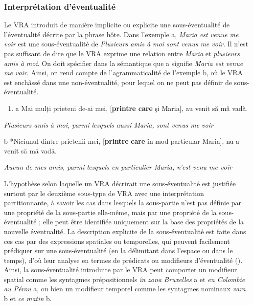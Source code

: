 \subsubsection{Interprétation d'éventualité}
Le VRA introduit de manière implicite ou explicite une sous-éventualité de l'éventualité décrite par la phrase hôte. Dans l'exemple a, \textit{Maria est venue me voir} est une sous-éventualité de \textit{Plusieurs amis à moi sont venus me voir}. Il n'est pas suffisant de dire que le VRA exprime une relation entre \textit{Maria} et \textit{plusieurs amis à moi}. On doit spécifier dans la sémantique que a signifie \textit{Maria est venue me voir}. Ainsi, on rend compte de l'agrammaticalité de l'exemple b, où le VRA est enchâssé dans une non-éventualité, pour lequel on ne peut pas définir de sous-éventualité.


\begin{enumerate}
\item \label{bkm:Ref295403595}a  Mai mulți prieteni de-ai mei, [\textbf{printre care} şi Maria], au venit să mă vadă.  


\end{enumerate}
{\itshape
Plusieurs amis à moi, parmi lesquels aussi Maria, sont venus me voir}

  b  *Niciunul dintre prietenii mei, [\textbf{printre} \textbf{care} în mod particular Maria], nu a venit să mă vadă.

{\itshape
Aucun de mes amis, parmi lesquels en particulier Maria, n'est venu me voir } 

L'hypothèse selon laquelle un VRA décrirait une sous-éventualité est justifiée surtout par le deuxième sous-type de VRA avec une interprétation partitionnante, à savoir les cas dans lesquels la sous-partie n'est pas définie par une propriété de la sous-partie elle-même, mais par une propriété de la sous-éventualité ; elle peut être identifiée uniquement sur la base des propriétés de la nouvelle éventualité. La description explicite de la sous-éventualité est faite dans ces cas par des expressions spatiales ou temporelles, qui peuvent facilement prédiquer sur une sous-éventualité (en la délimitant dans l'espace ou dans le temps), d'où leur analyse en termes de prédicats ou modifieurs d'éventualité (\citet{Rothstein2004}). Ainsi, la sous-éventualité introduite par le VRA peut comporter un modifieur spatial comme les syntagmes prépositionnels \textit{în zona Bruxelles} a  et \textit{en Colombie {\textbar} au Pérou} a, ou bien un modifieur temporel comme les syntagmes nominaux \textit{vara} b et \textit{ce matin} b.


